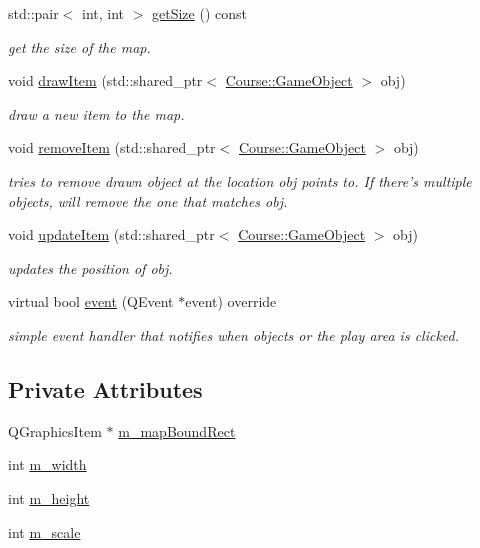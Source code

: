\begin{DoxyCompactItemize}
std\-::pair$<$ int, int $>$ \hyperlink{classCourse_1_1SimpleGameScene_a47bac76decd9c47bb4604a7f0c2d6de7}{get\-Size} () const 
\begin{DoxyCompactList}\small\item\em get the size of the map. \end{DoxyCompactList}\item 
void \hyperlink{classCourse_1_1SimpleGameScene_adc6d386caaf44e3ef33a266f46e7eb98}{draw\-Item} (std\-::shared\-\_\-ptr$<$ \hyperlink{classCourse_1_1GameObject}{Course\-::\-Game\-Object} $>$ obj)
\begin{DoxyCompactList}\small\item\em draw a new item to the map. \end{DoxyCompactList}\item 
void \hyperlink{classCourse_1_1SimpleGameScene_a9184f8347367a255ddb9a1b0ce23e134}{remove\-Item} (std\-::shared\-\_\-ptr$<$ \hyperlink{classCourse_1_1GameObject}{Course\-::\-Game\-Object} $>$ obj)
\begin{DoxyCompactList}\small\item\em tries to remove drawn object at the location obj points to. If there's multiple objects, will remove the one that matches obj. \end{DoxyCompactList}\item 
void \hyperlink{classCourse_1_1SimpleGameScene_ae175f970177c7564b6fb63f8869a44e3}{update\-Item} (std\-::shared\-\_\-ptr$<$ \hyperlink{classCourse_1_1GameObject}{Course\-::\-Game\-Object} $>$ obj)
\begin{DoxyCompactList}\small\item\em updates the position of obj. \end{DoxyCompactList}\item 
virtual bool \hyperlink{classCourse_1_1SimpleGameScene_a8853ddab78ee57fe69489cb246c2dcad}{event} (Q\-Event $\ast$event) override
\begin{DoxyCompactList}\small\item\em simple event handler that notifies when objects or the play area is clicked. \end{DoxyCompactList}\end{DoxyCompactItemize}
\subsection*{Private Attributes}
\begin{DoxyCompactItemize}
\item 
Q\-Graphics\-Item $\ast$ \hyperlink{classCourse_1_1SimpleGameScene_a0fb914c9a9a0b0f609a8e37122dfc66b}{m\-\_\-map\-Bound\-Rect}
\item 
int \hyperlink{classCourse_1_1SimpleGameScene_a092cd06906c5f7bf90932155cce61c65}{m\-\_\-width}
\item 
int \hyperlink{classCourse_1_1SimpleGameScene_ab9f181b61998050f4705136d4b8ac037}{m\-\_\-height}
\item 
int \hyperlink{classCourse_1_1SimpleGameScene_abcfe6adc631563891c7400147bb9de3f}{m\-\_\-scale}
\end{DoxyCompactItemize}


